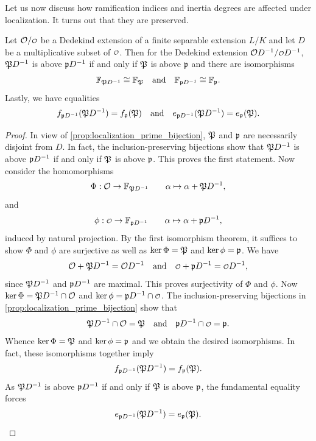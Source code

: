     Let us now discuss how ramification indices and inertia degrees are affected under localization. It turns out that they are preserved.

    \begin{proposition}\label{prop:ramification_setup_respects_localization}
      Let \(\mc{O}/\smc{O}\) be a Dedekind extension of a finite separable extension \(L/K\) and let \(D\) be a multiplicative subset of \(\smc{O}\). Then for the Dedekind extension \(\mc{O}D^{-1}/\smc{O}D^{-1}\), \(\mathfrak{P}D^{-1}\) is above \(\mathfrak{p}D^{-1}\) if and only if \(\mathfrak{P}\) is above \(\mathfrak{p}\) and there are isomorphisms
      \[
        \mathbb{F}_{\mathfrak{P}D^{-1}} \cong \mathbb{F}_{\mathfrak{P}} \quad \text{and} \quad \mathbb{F}_{\mathfrak{p}D^{-1}} \cong \mathbb{F}_{\mathfrak{p}}.
      \]
      Lastly, we have equalities
      \[
        f_{\mathfrak{p}D^{-1}}(\mathfrak{P}D^{-1}) = f_{\mathfrak{p}}(\mathfrak{P}) \quad \text{and} \quad e_{\mathfrak{p}D^{-1}}(\mathfrak{P}D^{-1}) = e_{\mathfrak{p}}(\mathfrak{P}).
      \]
    \end{proposition}
    \begin{proof}
      In view of \cref{prop:localization_prime_bijection}, \(\mathfrak{P}\) and \(\mathfrak{p}\) are necessarily disjoint from \(D\). In fact, the inclusion-preserving bijections show that \(\mathfrak{P}D^{-1}\) is above \(\mathfrak{p}D^{-1}\) if and only if \(\mathfrak{P}\) is above \(\mathfrak{p}\). This proves the first statement. Now consider the homomorphisms
      \[
        \Phi:\mathcal{O} \to \mathbb{F}_{\mathfrak{P}D^{-1}} \qquad \alpha \mapsto \alpha+\mathfrak{P}D^{-1},
      \]
      and
      \[
        \phi:\smc{O} \to \F_{\mf{p}D^{-1}} \qquad \a \mapsto \a+\mf{p}D^{-1},
      \]
      induced by natural projection. By the first isomorphism theorem, it suffices to show \(\Phi\) and \(\phi\) are surjective as well as \(\ker\Phi = \mathfrak{P}\) and \(\ker\phi = \mathfrak{p}\). We have
      \[
        \mc{O}+\mf{P}D^{-1} = \mc{O}D^{-1} \quad \text{and} \quad \smc{O}+\mf{p}D^{-1} = \smc{O}D^{-1},
      \]
      since \(\mathfrak{P}D^{-1}\) and \(\mathfrak{p}D^{-1}\) are maximal. This proves surjectivity of \(\Phi\) and \(\phi\). Now \(\ker\Phi = \mathfrak{P}D^{-1} \cap \mathcal{O}\) and \(\ker\phi = \mf{p}D^{-1} \cap \smc{O}\). The inclusion-preserving bijections in \cref{prop:localization_prime_bijection} show that
      \[
        \mf{P}D^{-1} \cap \mc{O} = \mf{P} \quad \text{and} \quad \mf{p}D^{-1} \cap \smc{O} = \mf{p}.
      \]
      Whence \(\ker\Phi = \mathfrak{P}\) and \(\ker\phi = \mathfrak{p}\) and we obtain the desired isomorphisms. In fact, these isomorphisms together imply
      \[
        f_{\mathfrak{p}D^{-1}}(\mathfrak{P}D^{-1}) = f_{\mathfrak{p}}(\mathfrak{P}).
      \]
      As \(\mathfrak{P}D^{-1}\) is above \(\mathfrak{p}D^{-1}\) if and only if \(\mathfrak{P}\) is above \(\mathfrak{p}\), the fundamental equality forces
      \[
        e_{\mathfrak{p}D^{-1}}(\mathfrak{P}D^{-1}) = e_{\mathfrak{p}}(\mathfrak{P}).
      \]
    \end{proof}

